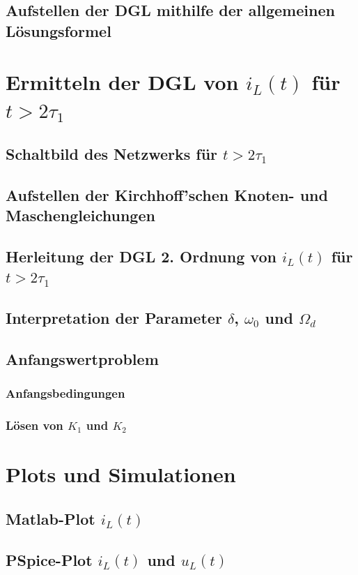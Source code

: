 \documentclass[11pt]{scrartcl}
\begin{document}
\subsection{Aufstellen der DGL mithilfe der allgemeinen Lösungsformel} %
\section{Ermitteln der DGL von $i_L(t)$ für $t > 2\tau_1$}%
\subsection{Schaltbild des Netzwerks für $t > 2\tau_1$}%
\subsection{Aufstellen der Kirchhoff'schen Knoten- und Maschengleichungen}%
\subsection{Herleitung der DGL 2. Ordnung von $i_L(t)$ für $t > 2\tau_1$}%
\subsection{Interpretation der Parameter $\delta$,  $\omega_0$ und $\Omega_d$}%
\subsection{Anfangswertproblem}%
\subsubsection{Anfangsbedingungen}%
\subsubsection{Lösen von $K_1$ und $K_2$}%
\section{Plots und Simulationen} %
\subsection{Matlab-Plot $i_L(t)$} %
\subsection{PSpice-Plot $i_L(t)$ und $u_L(t)$} %
\end{document}
